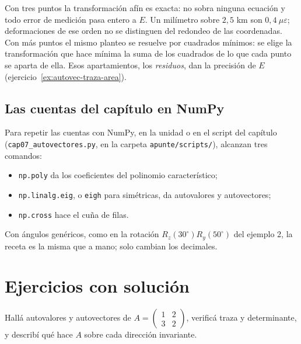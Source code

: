 \begin{atencion}
Con tres puntos la transformación afín es exacta: no sobra ninguna ecuación y todo error de
medición pasa entero a \(E\). Un milímetro sobre \(2{,}5\) km son \(0{,}4\ \mu\varepsilon\);
deformaciones de ese orden no se distinguen del redondeo de las coordenadas. Con más puntos
el mismo planteo se resuelve por cuadrados mínimos: se elige la transformación que hace mínima la
suma de los cuadrados de lo que cada punto se aparta de ella. Esos apartamientos, los
\emph{residuos}, dan la precisión de \(E\) (ejercicio~\ref{ex:autovec-traza-area}).
\end{atencion}

\subsection{Las cuentas del capítulo en NumPy}

Para repetir las cuentas con NumPy, en la unidad o en el script del capítulo
(\texttt{cap07\_autovectores.py}, en la carpeta \texttt{apunte/scripts/}), alcanzan tres
comandos:
\begin{itemize}
\item \texttt{np.poly} da los coeficientes del polinomio característico;
\item \texttt{np.linalg.eig}, o \texttt{eigh} para simétricas, da autovalores y autovectores;
\item \texttt{np.cross} hace el cuña de filas.
\end{itemize}
Con ángulos genéricos, como en la rotación \(R_z(30^\circ)R_y(50^\circ)\) del ejemplo 2, la receta es la misma que a
mano; solo cambian los decimales.

\section{Ejercicios con solución}

\begin{ejercicio}\label{ex:autovec-2x2}
Hallá autovalores y autovectores de \(A=\begin{pmatrix}1&2\\3&2\end{pmatrix}\), verificá
traza y determinante, y describí qué hace \(A\) sobre cada dirección invariante.
\end{ejercicio}

